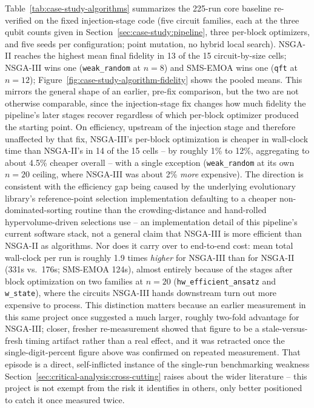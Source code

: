 Table~\ref{tab:case-study-algorithms} summarizes the 225-run core
baseline re-verified on the fixed injection-stage code (five circuit
families, each at the three qubit counts given in
Section~\ref{sec:case-study:pipeline}, three per-block optimizers, and
five seeds per configuration; point mutation, no hybrid local
search). NSGA-II reaches
the highest mean final fidelity in 13 of the 15 circuit-by-size cells;
NSGA-III wins one (\texttt{weak\_random} at $n{=}8$) and SMS-EMOA wins
one (\texttt{qft} at $n{=}12$); Figure~\ref{fig:case-study-algorithm-fidelity}
shows the pooled means. This mirrors the general shape of an
earlier, pre-fix comparison, but the two are not otherwise comparable,
since the injection-stage fix changes how much fidelity the pipeline's
later stages recover regardless of which per-block optimizer produced
the starting point. On efficiency, upstream of the injection stage and
therefore unaffected by that fix, NSGA-III's per-block optimization is
cheaper in wall-clock time than NSGA-II's in 14 of the 15 cells --
by roughly 1\% to 12\%, aggregating to about 4.5\% cheaper overall --
with a single exception (\texttt{weak\_random} at its own $n{=}20$
ceiling, where NSGA-III was about 2\% \emph{more} expensive). The
direction is consistent with the efficiency gap being caused by the
underlying evolutionary library's reference-point selection
implementation defaulting to a cheaper non-dominated-sorting routine
than the crowding-distance and hand-rolled hypervolume-driven selections
use -- an implementation detail of this pipeline's current software
stack, not a general claim that NSGA-III is more efficient than
NSGA-II as algorithms. Nor does it carry over to end-to-end cost: mean
total wall-clock per run is roughly 1.9 times \emph{higher} for NSGA-III
than for NSGA-II (331s vs.\ 176s; SMS-EMOA 124s), almost entirely
because of the stages after block optimization on two families at
$n{=}20$ (\texttt{hw\_efficient\_ansatz} and \texttt{w\_state}), where
the circuits NSGA-III hands downstream turn out more expensive to
process. This distinction matters because an earlier
measurement in this same project once suggested a much larger, roughly
two-fold advantage for NSGA-III; closer, fresher re-measurement showed
that figure to be a stale-versus-fresh timing artifact rather than a
real effect, and it was retracted once the single-digit-percent figure
above was confirmed on repeated measurement. That episode is a direct,
self-inflicted instance of the single-run benchmarking weakness
Section~\ref{sec:critical-analysis:cross-cutting} raises about the wider
literature -- this project is not exempt from the risk it identifies in
others, only better positioned to catch it once measured twice.

